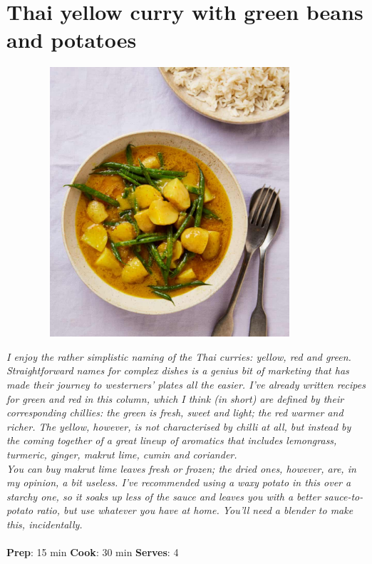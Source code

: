 \documentclass{book}
\begin{document}
\section{Thai yellow curry with green beans and potatoes}
\begin{figure}
\centering\includegraphics[width=10cm,height=10cm,keepaspectratio]{Recipe_Pictures/Thai_yellow_curry_with_green_beans_and_potatoes.png}
\end{figure}
\emph{I enjoy the rather simplistic naming of the Thai curries: yellow, red and green. Straightforward names for complex dishes is a genius bit of marketing that has made their journey to westerners’ plates all the easier. I’ve already written recipes for green and red in this column, which I think (in short) are defined by their corresponding chillies: the green is fresh, sweet and light; the red warmer and richer. The yellow, however, is not characterised by chilli at all, but instead by the coming together of a great lineup of aromatics that includes lemongrass, turmeric, ginger, makrut lime, cumin and coriander.\\ 
You can buy makrut lime leaves fresh or frozen; the dried ones, however, are, in my opinion, a bit useless. I’ve recommended using a waxy potato in this over a starchy one, so it soaks up less of the sauce and leaves you with a better sauce-to-potato ratio, but use whatever you have at home. You’ll need a blender to make this, incidentally.}\\\\ 
\textbf{Prep}: 15 min
\textbf{Cook}: 30 min
\textbf{Serves}: 4
\end{document}
